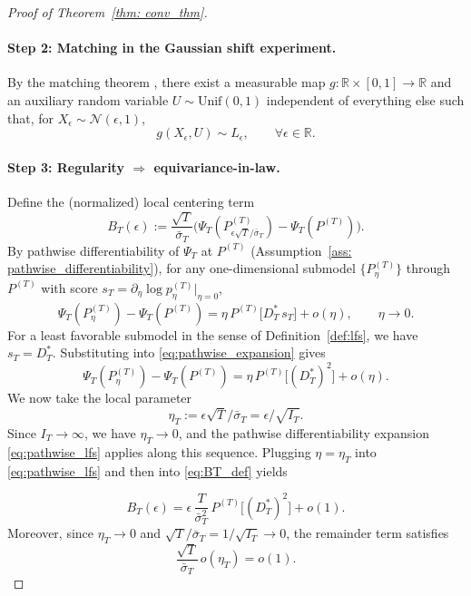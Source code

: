 \documentclass[11pt]{article}
\begin{document}
\begin{proof}[Proof of Theorem~\ref{thm: conv_thm}]
\paragraph{Step 2: Matching in the Gaussian shift experiment.}
By the matching theorem \citep[Theorem~7.10]{vanderVaart1998asymptotic},
there exist a measurable map $g:\mathbb R\times[0,1]\to\mathbb R$ and an
auxiliary random variable $U\sim\mathrm{Unif}(0,1)$ independent of
everything else such that, for $X_\epsilon\sim\mathcal N(\epsilon,1)$,
\begin{equation}\label{eq:matching_app}
g(X_\epsilon,U)\sim L_\epsilon,
\qquad \forall \epsilon\in\mathbb R.
\end{equation}

\paragraph{Step 3: Regularity $\Rightarrow$ equivariance-in-law.}
Define the (normalized) local centering term
\begin{equation}\label{eq:BT_def}
B_T(\epsilon)
:=
\frac{\sqrt{T}}{\bar\sigma_T}\Big(
\Psi_T(P^{(T)}_{\epsilon\sqrt{T}/\bar\sigma_T})-\Psi_T(P^{(T)})
\Big).
\end{equation}
By pathwise differentiability of $\Psi_T$ at $P^{(T)}$ (Assumption~\ref{ass: pathwise_differentiability}),
for any one-dimensional submodel $\{P^{(T)}_\eta\}$ through $P^{(T)}$ with score
$s_T=\partial_\eta\log p^{(T)}_\eta|_{\eta=0}$,
\begin{equation}\label{eq:pathwise_expansion}
\Psi_T(P^{(T)}_\eta)-\Psi_T(P^{(T)})
=
\eta\,P^{(T)}\!\big[D_T^*\,s_T\big]+o(\eta),
\qquad \eta\to0.
\end{equation}
For a least favorable submodel in the sense of Definition~\ref{def:lfs}, we have
$s_T=D_T^*$. Substituting into \eqref{eq:pathwise_expansion} gives
\begin{equation}\label{eq:pathwise_lfs}
\Psi_T(P^{(T)}_\eta)-\Psi_T(P^{(T)})
=
\eta\,P^{(T)}\!\big[(D_T^*)^2\big]+o(\eta).
\end{equation}
We now take the local parameter
\[
\eta_T:=\epsilon\sqrt{T}/\bar\sigma_T=\epsilon/\sqrt{I_T}.
\]
Since $I_T\to\infty$, we have $\eta_T\to0$, and the pathwise differentiability
expansion \eqref{eq:pathwise_lfs} applies along this sequence. Plugging
$\eta=\eta_T$ into \eqref{eq:pathwise_lfs} and then into \eqref{eq:BT_def}
yields

\begin{equation}\label{eq:BT_precise}
B_T(\epsilon)
=
\epsilon\,\frac{T}{\bar\sigma_T^2}\,P^{(T)}\!\big[(D_T^*)^2\big]+o(1).
\end{equation}
Moreover, since $\eta_T\to0$ and $\sqrt{T}/\bar\sigma_T=1/\sqrt{I_T}\to0$,
the remainder term satisfies
\[
\frac{\sqrt{T}}{\bar\sigma_T}\,o(\eta_T)=o(1).
\]


\end{proof}
\end{document}
